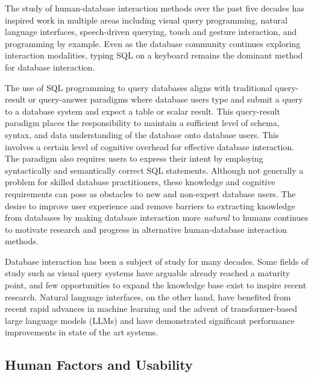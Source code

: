 
The study of human-database interaction methods over the past five decades has inspired work in multiple areas including visual query programming, natural language interfaces, speech-driven querying, touch and gesture interaction, and programming by example. 
Even as the database community continues exploring interaction modalities, typing SQL on a keyboard remains the dominant method for database interaction.

The use of SQL programming to query databases aligns with traditional query-result or query-answer paradigms \cite{10.14778/3402755.3402797, 8509430} where database users type and submit a query to a database system and expect a table or scalar result. 
This query-result paradigm places the responsibility to maintain a sufficient level of schema, syntax, and data understanding of the database onto database users.
This involves a certain level of cognitive overhead for effective database interaction. 
The paradigm also requires users to express their intent by employing syntactically and semantically correct SQL statements. 
Although not generally a problem for skilled database practitioners, these knowledge and cognitive requirements can pose as obstacles to new and non-expert database users. 
The desire to improve user experience and remove barriers to extracting knowledge from databases by making database interaction more \emph{natural} to humans continues to motivate research and progress in alternative human-database interaction methods.

Database interaction has been a subject of study for many decades. Some fields of study such as visual query systems have arguable already reached a maturity point, and few opportunities to expand the knowledge base exist to inspire recent research. Natural language interfaces, on the other hand, have benefited from recent rapid advances in machine learning and the advent of transformer-based large language models (LLMs) and have demonstrated significant performance improvements in state of the art systems. 

\subsection{Human Factors and Usability}

